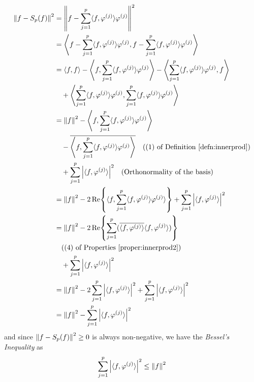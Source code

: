 \begin{align} 
\norm{f - S_p(f)}^2 &= \norm{f - \sum_{j=1}^{p} \langle f, \varphi^{(j)} \rangle \varphi^{(j)}}^2 \nonumber \\
&= \left\langle f - \sum_{j=1}^{p} \langle f, \varphi^{(j)} \rangle \varphi^{(j)}, f - \sum_{j=1}^{p} \langle f, \varphi^{(j)} \rangle \varphi^{(j)} \right\rangle \nonumber \\
&= \langle f, f \rangle - \left\langle f, \sum_{j=1}^{p} \langle f, \varphi^{(j)} \rangle \varphi^{(j)} \right\rangle - \left\langle \sum_{j=1}^{p} \langle f, \varphi^{(j)} \rangle \varphi^{(j)}, f \right\rangle \nonumber \\
&\quad + \left\langle \sum_{j=1}^{p} \langle f, \varphi^{(j)} \rangle \varphi^{(j)}, \sum_{j=1}^{p} \langle f, \varphi^{(j)} \rangle \varphi^{(j)} \right\rangle \nonumber \\
&= \norm{f}^2 - \left\langle f, \sum_{j=1}^{p} \langle f, \varphi^{(j)} \rangle \varphi^{(j)} \right\rangle \nonumber \\
&\quad - \overline{\left\langle f, \sum_{j=1}^{p} \langle f, \varphi^{(j)} \rangle \varphi^{(j)} \right\rangle} \quad \text{((1) of Definition \ref{defn:innerprod})} \nonumber \\
&\quad + \sum_{j=1}^{p} \abs{\langle f, \varphi^{(j)} \rangle}^2 \quad \text{(Orthonormality of the basis)} \nonumber \\
&= \norm{f}^2 - 2\Re{\langle f, \sum_{j=1}^{p} \langle f, \varphi^{(j)} \rangle \varphi^{(j)} \rangle} + \sum_{j=1}^{p} \abs{\langle f, \varphi^{(j)} \rangle}^2 \nonumber \\
&= \norm{f}^2 - 2\Re{\sum_{j=1}^{p} (\overline{\langle f, \varphi^{(j)} \rangle} \langle f, \varphi^{(j)} \rangle)} \nonumber \\
& \quad \text{((4) of Properties \ref{proper:innerprod2})}\nonumber \\
&\quad + \sum_{j=1}^{p} \abs{\langle f, \varphi^{(j)} \rangle}^2 \nonumber \\
&= \norm{f}^2 - 2\sum_{j=1}^{p} \abs{\langle f, \varphi^{(j)} \rangle}^2 + \sum_{j=1}^{p} \abs{\langle f, \varphi^{(j)} \rangle}^2 \nonumber \\
&= \norm{f}^2 - \sum_{j=1}^{p} \abs{\langle f, \varphi^{(j)} \rangle}^2
\end{align}
and since $\norm{f - S_p(f)}^2 \geq 0$ is always non-negative, we have the \textit{Bessel's Inequality} as
\begin{align}
\sum_{j=1}^{p} \abs{\langle f, \varphi^{(j)} \rangle}^2 \leq \norm{f}^2  \label{eqn:Bessel}
\end{align}

